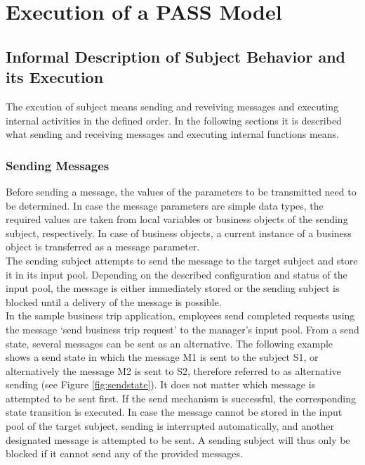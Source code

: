 \chapter{Execution of a PASS Model}
\label{PASSExec}

\section{Informal Description of Subject Behavior and its Execution}
The excution of subject means sending and reveiving messages and executing internal activities in the defined order. In the following sections it is described what sending and receiving messages and executing internal functions means.

\subsection{Sending Messages}
Before sending a message, the values of the parameters to be transmitted need to be determined. In case the message parameters are simple data types, the required values are taken from local variables or business objects of the sending subject, respectively. In case of business objects, a current instance of a business object is transferred as a message parameter.\\
The sending subject attempts to send the message to the target subject and store it in its input pool. Depending on the described configuration and status of the input pool, the message is either immediately stored or the sending subject is blocked until a delivery of the message is possible.\\
In the sample business trip application, employees send completed requests using the message ‘send business trip request’ to the manager’s input pool. From a send state, several messages can be sent as an alternative. The following example shows a send state in which the message M1 is sent to the subject S1, or alternatively the message M2 is sent to S2, therefore referred to as alternative sending (see Figure \ref{fig:sendstate}). It does not matter which message is attempted to be sent first. If the send mechanism is successful, the corresponding state transition is executed. In case the message cannot be stored in the input pool of the target subject, sending is interrupted automatically, and another designated message is attempted to be sent. A sending subject will thus only be blocked if it cannot send any of the provided messages.

